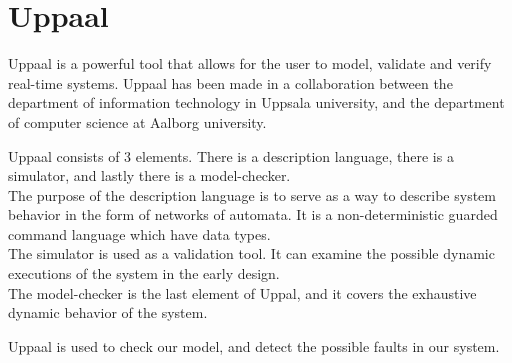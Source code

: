 \section{Uppaal}

Uppaal is a powerful tool that allows for the user to model, validate and verify real-time systems. Uppaal has been made in a collaboration between the department of information technology in Uppsala university, and the department of computer science at Aalborg university.

Uppaal consists of 3 elements. There is a description language, there is a simulator, and lastly there is a model-checker.\\
The purpose of the description language is to serve as a way to describe system behavior in the form of networks of automata. It is a non-deterministic guarded command language which have data types.\\
The simulator is used as a validation tool. It can examine the possible dynamic executions of the system in the early design.\\
The model-checker is the last element of Uppal, and it covers the exhaustive dynamic behavior of the system. \cite{uppaal}

Uppaal is used to check our model, and detect the possible faults in our system. 
